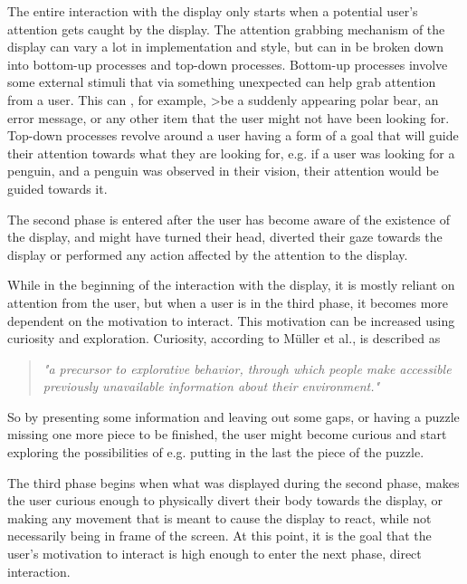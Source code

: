     The entire interaction with the display only starts when a potential user's attention gets caught by the display. The attention grabbing mechanism of the display can vary a lot in implementation and style, but can in be broken down into bottom-up processes and top-down processes\cite{interactivePublicDisplays}. Bottom-up processes involve some external stimuli that via something unexpected can help grab attention from a user. This can 
    , for example, >be a suddenly appearing polar bear, an error message, or any other item that the user might not have been looking for\cite{interactivePublicDisplays}. Top-down processes revolve around a user having a form of a goal that will guide their attention towards what they are looking for\cite{interactivePublicDisplays}, e.g. if a user was looking for a penguin, and a penguin was observed in their vision, their attention would be guided towards it.
    
    The second phase is entered after the user has become aware of the existence of the display, and might have turned their head, diverted their gaze towards the display or performed any action affected by the attention to the display\cite{interactivePublicDisplays}.
    
    While in the beginning of the interaction with the display, it is mostly reliant on attention from the user, but when a user is in the third phase, it becomes more dependent on the motivation to interact\cite{interactivePublicDisplays}. This motivation can be increased using curiosity and exploration\cite{interactivePublicDisplays}. Curiosity, according to Müller et al., is described as 
    \begin{quote}
        \textit{"a precursor to explorative behavior, through which people make accessible previously unavailable information about their environment."}\cite{interactivePublicDisplays}
    \end{quote}
    So by presenting some information and leaving out some gaps, or having a puzzle missing one more piece to be finished, the user might become curious and start exploring the possibilities of e.g. putting in the last the piece of the puzzle\cite{interactivePublicDisplays}.
    
    The third phase begins when what was displayed during the second phase, makes the user curious enough to physically divert their body towards the display, or making any movement that is meant to cause the display to react, while not necessarily being in frame of the screen. At this point, it is the goal that the user's motivation to interact is high enough to enter the next phase, direct interaction\cite{interactivePublicDisplays}.
    

